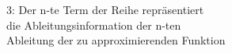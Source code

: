 \documentclass[preview]{standalone}
\begin{document}
\begin{center}
3: Der n-te Term der Reihe repräsentiert\\die Ableitungsinformation der n-ten\\Ableitung der zu approximierenden Funktion
\end{center}
\end{document}
